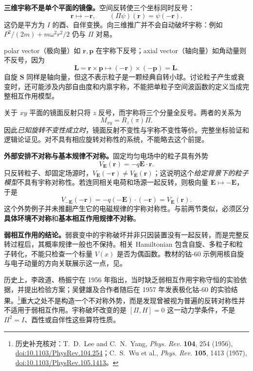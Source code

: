 \textbf{三维宇称不是单个平面的镜像。}空间反转使三个坐标同时反号：
\begin{equation}
  \mathbf r\longmapsto-\mathbf r,
  \qquad (\Pi\psi)(\mathbf r)=\psi(-\mathbf r).
\end{equation}
这仍是平方为 $I$ 的酉、自伴变换。向三维推广并不会自动破坏宇称：例如 $P^2/(2m)+m\omega^2r^2/2$ 仍与 $\Pi$ 对易。

polar vector（极向量）如 $\mathbf r,\mathbf p$ 在宇称下反号；axial vector（轴向量）如角动量则不反号，因为
\begin{equation}
  \mathbf L=\mathbf r\times\mathbf p
     \longmapsto(-\mathbf r)\times(-\mathbf p)=\mathbf L.
\end{equation}
自旋 $\mathbf S$ 同样是轴向量，但这不表示粒子是一颗经典自转小球。讨论粒子产生或衰变时，还可能涉及内部自由度和内禀宇称，不能把单粒子空间波函数的定义当成完整相互作用模型。

关于 $xy$ 平面的镜面反射只将 $z$ 反号，而宇称将三个分量全反号。两者的关系为
\begin{equation}
  \boxed{M_{xy}=R_z(\pi)\Pi}.
\end{equation}
因此\emph{已知旋转不变性成立时}，镜面反射不变性与宇称不变性等价。完整坐标验证和逻辑论证见。对不具有相应旋转对称性的系统，不能略去这个前提。

\textbf{外部安排不对称与基本规律不对称。}固定均匀电场中的粒子具有外势
\begin{equation}
  V_{\mathbf E}(\mathbf r)=-q\mathbf E\cdot\mathbf r.
\end{equation}
只反转粒子、却固定场源时，$V_{\mathbf E}(-\mathbf r)\ne V_{\mathbf E}(\mathbf r)$；这说明这个\emph{给定背景下的粒子模型}不具有宇称对称性。若连同相关电荷和场源一起反转，则极向量 $\mathbf E\mapsto-\mathbf E$，于是
\begin{equation}
  V_{-\mathbf E}(-\mathbf r)
   =-q(-\mathbf E)\cdot(-\mathbf r)
   =V_{\mathbf E}(\mathbf r).
\end{equation}
这个外势例子并未推翻产生它的电磁规律的宇称对称性。与前两节类似，必须区分\textbf{具体环境不对称}和\textbf{基本相互作用规律不对称}。

\textbf{弱相互作用的结论。}弱衰变中的宇称破坏并非只因装置没有一起反转，而是完整反转过程后，其概率规律一般也不保持。相关 Hamiltonian 包含自旋、多粒子和粒子转化，不能只检查一个标量 $V(x)$ 是否为偶函数。教材的钴-60 示例用核自旋与电子动量的方向关联展示这一点，见。

历史上，李政道、杨振宁在 1956 年指出，当时缺乏弱相互作用宇称守恒的实验依据，并提出检验方案；吴健雄及合作者随后在 1957 年发表极化钴-60 的实验结果。\footnote{历史补充核对：T.~D.~Lee and C.~N.~Yang, \textit{Phys. Rev.} \textbf{104}, 254 (1956), \href{https://doi.org/10.1103/PhysRev.104.254}{doi:10.1103/PhysRev.104.254}；C.~S.~Wu et al., \textit{Phys. Rev.} \textbf{105}, 1413 (1957), \href{https://doi.org/10.1103/PhysRev.105.1413}{doi:10.1103/PhysRev.105.1413}。}重大之处不是构造一个不对称外势，而是发现曾被视为普遍的反转对称性并不适用于弱相互作用。宇称破坏改变的是 $[\Pi,H]=0$ 这一动力学条件，不是 $\Pi^2=I$、酉性或自伴性这些算符性质。

